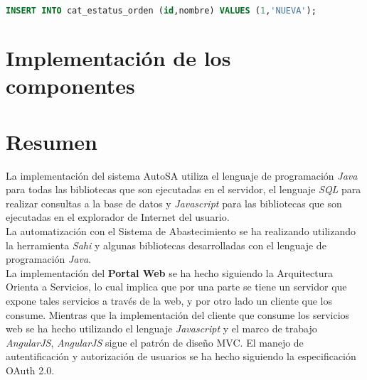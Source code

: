 \begin{lstlisting}[language=SQL, caption={Sentencia insertar un registro.}, captionpos=b, label={lst:sql-insert}]
INSERT INTO cat_estatus_orden (id,nombre) VALUES (1,'NUEVA');
\end{lstlisting}

%

\section{Implementación de los componentes}







%



%

\section{Resumen}
La implementación del sistema AutoSA utiliza el lenguaje de programación \textit{Java} para todas las bibliotecas que son ejecutadas en el servidor, el lenguaje \textit{SQL} para realizar consultas a la base de datos y \textit{Javascript} para las bibliotecas que son ejecutadas en el explorador de Internet del usuario.\\
La automatización con el Sistema de Abastecimiento se ha realizando utilizando la herramienta \textit{Sahi} y algunas bibliotecas desarrolladas con el lenguaje de programación \textit{Java}.\\
La implementación del \textbf{Portal Web} se ha hecho siguiendo la Arquitectura Orienta a Servicios, lo cual implica que por una parte se tiene un servidor que expone tales servicios a través de la web, y por otro lado un cliente que los consume. Mientras que la implementación del cliente que consume los servicios web se ha hecho utilizando el lenguaje \textit{Javascript} y el marco de trabajo \textit{AngularJS}, \textit{AngularJS} sigue el patrón de diseño MVC. El manejo de autentificación y autorización de usuarios se ha hecho siguiendo la especificación OAuth 2.0.

